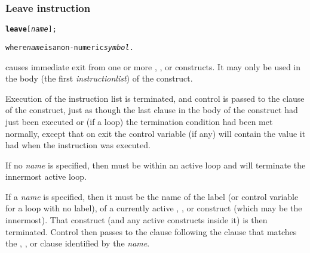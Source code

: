 \subsubsection{Leave instruction}\label{refleave}
\index{,}
\begin{shaded}
\begin{alltt}
\textbf{leave} [\emph{name}];

where \emph{name} is a non-numeric \emph{symbol}.
\end{alltt}
\end{shaded}
  causes immediate exit from one or more ,
, or  constructs.
It may only be used in the body (the first \emph{instructionlist})
of the construct.
 
Execution of the instruction list is terminated, and control is
passed to the  clause of the construct, just as though the
last clause in the body of the construct had just been executed or (if
a loop) the termination condition had been met normally, except that on
exit the control variable (if any) will contain the value it had when
the  instruction was executed.
 
If no \emph{name} is specified, then  must be
within an active loop and will terminate the innermost active loop.
 
If a \emph{name} is specified, then it must be the name of the
label (or control variable for a loop with no label), of a currently
active , , or  construct
(which may be the innermost).  That construct (and any active constructs
inside it) is then terminated.  Control then passes to the clause
following the  clause that matches the
, , or  clause identified by the
\emph{name}.

